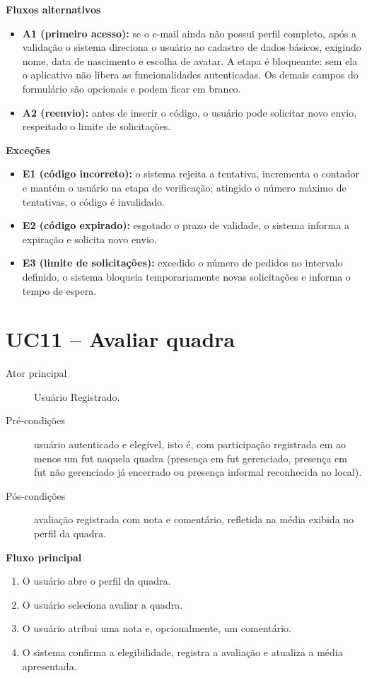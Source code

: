 \begin{apendicesenv}
        \noindent\textbf{Fluxos alternativos}
        \begin{itemize}
            \item \textbf{A1 (primeiro acesso):} se o e-mail ainda não possui perfil completo, após a validação o sistema direciona o usuário ao cadastro de dados básicos, exigindo nome, data de nascimento e escolha de avatar. A etapa é bloqueante: sem ela o aplicativo não libera as funcionalidades autenticadas. Os demais campos do formulário são opcionais e podem ficar em branco.
            \item \textbf{A2 (reenvio):} antes de inserir o código, o usuário pode solicitar novo envio, respeitado o limite de solicitações.
        \end{itemize}

        \noindent\textbf{Exceções}
        \begin{itemize}
            \item \textbf{E1 (código incorreto):} o sistema rejeita a tentativa, incrementa o contador e mantém o usuário na etapa de verificação; atingido o número máximo de tentativas, o código é invalidado.
            \item \textbf{E2 (código expirado):} esgotado o prazo de validade, o sistema informa a expiração e solicita novo envio.
            \item \textbf{E3 (limite de solicitações):} excedido o número de pedidos no intervalo definido, o sistema bloqueia temporariamente novas solicitações e informa o tempo de espera.
        \end{itemize}

    \section*{UC11 -- Avaliar quadra}
        \begin{description}
            \item[Ator principal] Usuário Registrado.
            \item[Pré-condições] usuário autenticado e elegível, isto é, com participação registrada em ao menos um fut naquela quadra (presença em fut gerenciado, presença em fut não gerenciado já encerrado ou presença informal reconhecida no local).
            \item[Pós-condições] avaliação registrada com nota e comentário, refletida na média exibida no perfil da quadra.
        \end{description}

        \noindent\textbf{Fluxo principal}
        \begin{enumerate}
            \item O usuário abre o perfil da quadra.
            \item O usuário seleciona avaliar a quadra.
            \item O usuário atribui uma nota e, opcionalmente, um comentário.
            \item O sistema confirma a elegibilidade, registra a avaliação e atualiza a média apresentada.
        \end{enumerate}


\end{apendicesenv}

